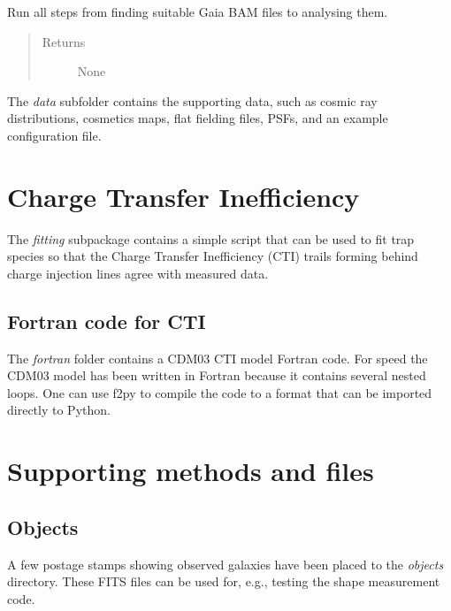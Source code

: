 \documentclass[a4paper,11pt,english]{sphinxmanual}
\begin{document}

\begin{fulllineitems}
\label{analysis:analysis.analyseGaiaBAMCosmicRayData.runAll}
Run all steps from finding suitable Gaia BAM files to analysing them.
\begin{quote}\begin{description}
\item[{Returns}] \leavevmode
None

\end{description}\end{quote}

\end{fulllineitems}


The \emph{data} subfolder contains the supporting data, such as cosmic ray distributions, cosmetics maps,
flat fielding files, PSFs, and an example configuration file.


\chapter{Charge Transfer Inefficiency}
\label{index:charge-transfer-inefficiency}
The \emph{fitting} subpackage contains a simple script that can be used to fit trap species so that the
Charge Transfer Inefficiency (CTI) trails forming behind charge injection lines agree with measured data.


\section{Fortran code for CTI}
\label{index:fortran-code-for-cti}
The \emph{fortran} folder contains a CDM03 CTI model Fortran code. For speed the CDM03 model has been written in Fortran
because it contains several nested loops. One can use f2py to compile the code to a format that can be imported
directly to Python.


\chapter{Supporting methods and files}
\label{index:supporting-methods-and-files}

\section{Objects}
\label{index:objects}
A few postage stamps showing observed galaxies have been placed to the \emph{objects} directory. These FITS files
can be used for, e.g., testing the shape measurement code.
\end{document}
